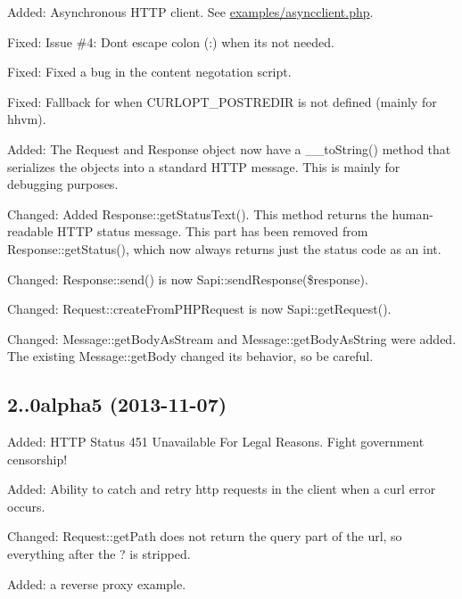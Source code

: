 \begin{DoxyItemize}
\item Added\+: Asynchronous H\+T\+TP client. See \mbox{\hyperlink{asyncclient_8php_source}{examples/asyncclient.\+php}}.
\item Fixed\+: Issue \#4\+: Don\textquotesingle{}t escape colon (\+:) when it\textquotesingle{}s not needed.
\item Fixed\+: Fixed a bug in the content negotation script.
\item Fixed\+: Fallback for when C\+U\+R\+L\+O\+P\+T\+\_\+\+P\+O\+S\+T\+R\+E\+D\+IR is not defined (mainly for hhvm).
\item Added\+: The Request and Response object now have a {\ttfamily \+\_\+\+\_\+to\+String()} method that serializes the objects into a standard H\+T\+TP message. This is mainly for debugging purposes.
\item Changed\+: Added Response\+::get\+Status\+Text(). This method returns the human-\/readable H\+T\+TP status message. This part has been removed from Response\+::get\+Status(), which now always returns just the status code as an int.
\item Changed\+: Response\+::send() is now Sapi\+::send\+Response(\$response).
\item Changed\+: Request\+::create\+From\+P\+H\+P\+Request is now Sapi\+::get\+Request().
\item Changed\+: Message\+::get\+Body\+As\+Stream and Message\+::get\+Body\+As\+String were added. The existing Message\+::get\+Body changed it\textquotesingle{}s behavior, so be careful.
\end{DoxyItemize}

\subsection*{2..\+0alpha5 (2013-\/11-\/07) }


\begin{DoxyItemize}
\item Added\+: H\+T\+TP Status 451 Unavailable For Legal Reasons. Fight government censorship!
\item Added\+: Ability to catch and retry http requests in the client when a curl error occurs.
\item Changed\+: Request\+::get\+Path does not return the query part of the url, so everything after the ? is stripped.
\item Added\+: a reverse proxy example.
\end{DoxyItemize}

